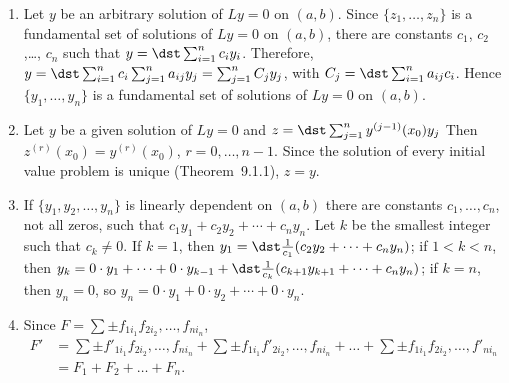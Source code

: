 \documentclass[openany]{book}
\newenvironment{sectionSolutions}{
 \begin{enumerate}[item-label={\thesection.\arabic{enumi}.}]
}{
 \end{enumerate}
}
\begin{document}
\begin{sectionSolutions}
\item
Let $y$ be an arbitrary solution of $Ly=0$ on $(a,b)$. Since
$\{z_1,\dots,z_n\}$ is a fundamental set of solutions of $Ly=0$
on $(a,b)$, there are constants $c_1$, $c_2$,\dots, $c_n$
such that $y=\dst\sum_{i=1}^nc_iy_i$. Therefore,
$y=\dst\sum_{i=1}^nc_i\sum_{j=1}^n a_{ij}y_j=\sum_{j=1}^n C_jy_j$,
with $C_j=\dst\sum_{i=1}^na_{ij}c_i$.
Hence $\{y_1,\dots,y_n\}$ is a fundamental set of solutions of
$Ly=0$ on $(a,b)$.


\item
Let $y$ be a given solution of $Ly=0$ and
$z=\dst\sum_{j=1}^ny^{(j-1)}(x_0)y_j$ Then
$z^{(r)}(x_0)=y^{(r)}(x_0)$,
$r=0,\dots,n-1$. Since the solution of every initial value problem
is unique (Theorem~9.1.1), $z=y$.


\item
If $\{y_1,y_2,\dots,y_n\}$ is linearly dependent on $(a,b)$
there are constants $c_1,\dots,c_n$, not all zeros, such that
$c_1y_1+c_2y_2+\cdots+c_ny_n$. Let $k$ be the smallest integer
such that $c_k\ne0$.  If $k=1$, then $y_1=\dst\frac{1}{
c_1}(c_2y_2+\cdots + c_ny_n)$; if $1<k<n$, then $y_k=0\cdot y_1+
\cdots+ 0\cdot y_{k-1}+\dst\frac{1}{
c_k}(c_{k+1}y_{k+1}+\cdots+c_ny_n)$;
 if $k=n$, then $y_n=0$, so $y_n=0\cdot y_1+0\cdot
y_2+\cdots+ 0\cdot y_n$.


\item
Since
$F=\sum\pm f_{1i_1}f_{2i_2},\dots,f_{ni_n}$,
\begin{align*}
F'&=\sum\pm f'_{1i_1}f_{2i_2},\dots,f_{ni_n}
+\sum\pm f_{1i_1}f'_{2i_2},\dots,f_{ni_n}+\dots+
\sum\pm f_{1i_1}f_{2i_2},\dots,f'_{ni_n}\\
&=F_1+F_2+\dots+F_n.
\end{align*}



\end{sectionSolutions}
\end{document}

